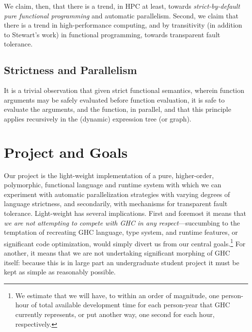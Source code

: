 \documentclass{llncs}
\begin{document}
We claim, then, that there is a trend, in HPC at least, towards
\emph{strict-by-default pure functional programming} and automatic
parallelism.
Second, we claim that there is a trend in
high-performance computing, and by transitivity (in addition to Stewart's
work) in functional programming, towards transparent fault tolerance.

\subsection{Strictness and Parallelism}
It is a trivial observation that given strict functional semantics, wherein
function arguments may be safely evaluated before function evaluation, it is
safe to evaluate the arguments, and the function, in parallel, and that this
principle applies recursively in the (dynamic) expression tree (or graph).

\section{Project and Goals}
Our project is the light-weight implementation of a pure, higher-order,
polymorphic, functional language and runtime system with which we can
experiment with automatic parallelization strategies with varying degrees of
language strictness, and secondarily, with mechanisms for transparent fault
tolerance.  Light-weight has several implications.  First and foremost it
means that \emph{we are not attempting to compete with GHC in any
  respect}---succumbing to the temptation of recreating GHC language, type
system, and runtime features, or significant code optimization, would simply
divert us from our central goals.\footnote{We estimate that we will have, to
  within an order of magnitude, one person-hour of total available development
  time for each person-year that GHC currently represents, or put another way,
  one second for each hour, respectively.}  For another, it means that we are
not undertaking significant morphing of GHC itself: because this is in large
part an undergraduate student project it must be kept as simple as reasonably
possible.  
\end{document}
